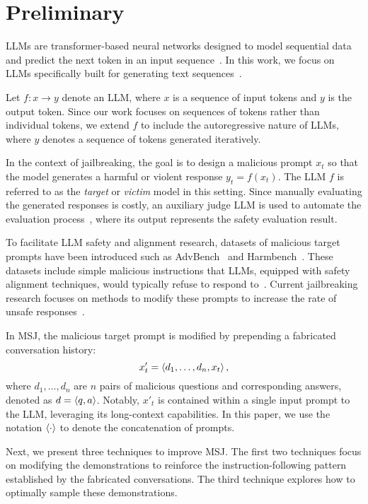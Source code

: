 \section{Preliminary}
LLMs are transformer-based neural networks designed to model sequential data and predict the next token in an input sequence~\citep{vaswani2017attention}. In this work, we focus on LLMs specifically built for generating text sequences~\citep{brown2020language, achiam2023gpt, touvron2023llama}. 


Let $f: x \rightarrow y$ denote an LLM, where $x$ is a sequence of input tokens and $y$ is the output token. Since our work focuses on sequences of tokens rather than individual tokens, we extend $f$ to include the autoregressive nature of LLMs, where $y$ denotes a sequence of tokens generated iteratively.

In the context of jailbreaking, the goal is to design a malicious prompt $x_t$ so that the model generates a harmful or violent response $y_t = f(x_t)$. The LLM $f$ is referred to as the \textit{target} or \textit{victim} model in this setting. Since manually evaluating the generated responses is costly, an auxiliary judge LLM is used to automate the evaluation process~\citep{perez2022red, ganguli2022red}, where its output represents the safety evaluation result.

To facilitate LLM safety and alignment research, datasets of malicious target prompts have been introduced such as AdvBench~\citep{zou2023universal} and Harmbench~\citep{mazeika2024harmbench}. These datasets include simple malicious instructions that LLMs, equipped with safety alignment techniques, would typically refuse to respond to~\citep{ouyang2022training,bai2022training}. Current jailbreaking research focuses on methods to modify these prompts to increase the rate of unsafe responses~\citep{zou2023universal, wei2024jailbroken}.

In MSJ, the malicious target prompt is modified by prepending a fabricated conversation history:
\begin{equation}\label{eq:msj}
    x'_t= \left\langle d_1, \dotsc, d_n, x_{t}\right\rangle,
\end{equation}
where $d_1, \dotsc, d_n$ are $n$ pairs of malicious questions and corresponding answers, denoted as $d = \left\langle q, a\right\rangle$. Notably, $x'_t$ is contained within a single input prompt to the LLM, leveraging its long-context capabilities. In this paper, we use the notation $\left\langle\cdot\right\rangle$ to denote the concatenation of prompts.

Next, we present three techniques to improve MSJ. The first two techniques focus on modifying the demonstrations to reinforce the instruction-following pattern established by the fabricated conversations. The third technique explores how to optimally sample these demonstrations.


